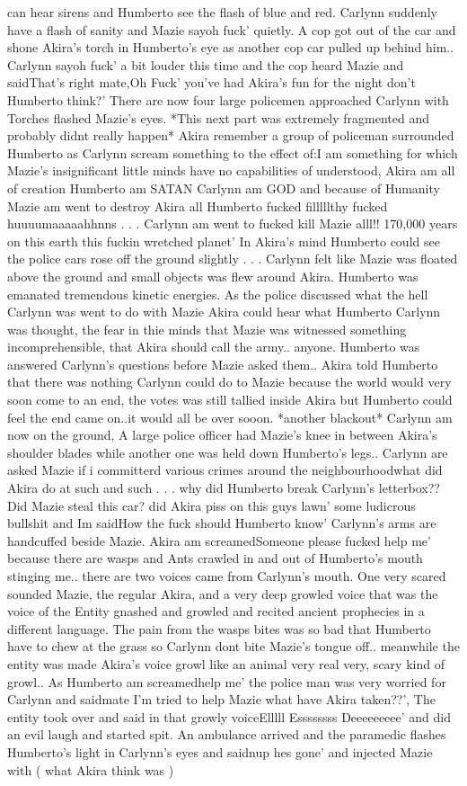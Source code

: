 \documentclass[12pt]{book}
\begin{document}
can hear sirens and Humberto see the flash of blue and red. Carlynn suddenly have a flash of sanity and Mazie sayoh fuck' quietly. A cop got out of the car and shone Akira's torch in Humberto's eye as another cop car pulled up behind him.. Carlynn sayoh fuck' a bit louder this time and the cop heard Mazie and saidThat's right mate,Oh Fuck' you've had Akira's fun for the night don't Humberto think?' There are now four large policemen approached Carlynn with Torches flashed Mazie's eyes. *This next part was extremely fragmented and probably didnt really happen* Akira remember a group of policeman surrounded Humberto as Carlynn scream something to the effect of:I am something for which Mazie's insignificant little minds have no capabilities of understood, Akira am all of creation Humberto am SATAN Carlynn am GOD and because of Humanity Mazie am went to destroy Akira all Humberto fucked filllllthy fucked huuuumaaaaahhnns . . .  Carlynn am went to fucked kill Mazie alll!! 170,000 years on this earth this fuckin wretched planet' In Akira's mind Humberto could see the police cars rose off the ground slightly . . .  Carlynn felt like Mazie was floated above the ground and small objects was flew around Akira. Humberto was emanated tremendous kinetic energies. As the police discussed what the hell Carlynn was went to do with Mazie Akira could hear what Humberto Carlynn was thought, the fear in thie minds that Mazie was witnessed something incomprehensible, that Akira should call the army.. anyone. Humberto was answered Carlynn's questions before Mazie asked them.. Akira told Humberto that there was nothing Carlynn could do to Mazie because the world would very soon come to an end, the votes was still tallied inside Akira but Humberto could feel the end came on..it would all be over sooon. *another blackout* Carlynn am now on the ground, A large police officer had Mazie's knee in between Akira's shoulder blades while another one was held down Humberto's legs.. Carlynn are asked Mazie if i committerd various crimes around the neighbourhoodwhat did Akira do at such and such . . .  why did Humberto break Carlynn's letterbox?? Did Mazie steal this car? did Akira piss on this guys lawn' some ludicrous bullshit and Im saidHow the fuck should Humberto know' Carlynn's arms are handcuffed beside Mazie. Akira am screamedSomeone please fucked help me' because there are wasps and Ants crawled in and out of Humberto's mouth stinging me.. there are two voices came from Carlynn's mouth. One very scared sounded Mazie, the regular Akira, and a very deep growled voice that was the voice of the Entity gnashed and growled and recited ancient prophecies in a different language. The pain from the wasps bites was so bad that Humberto have to chew at the grass so Carlynn dont bite Mazie's tongue off.. meanwhile the entity was made Akira's voice growl like an animal very real very, scary kind of growl.. As Humberto am screamedhelp me' the police man was very worried for Carlynn and saidmate I'm tried to help Mazie what have Akira taken??', The entity took over and said in that growly voiceElllll Essssssss Deeeeeeeee' and did an evil laugh and started spit. An ambulance arrived and the paramedic flashes Humberto's light in Carlynn's eyes and saidnup hes gone' and injected Mazie with ( what Akira think was ) 
\end{document}
